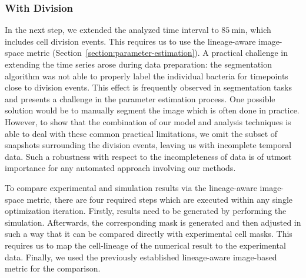 \subsubsection{With Division}
\label{sec:application-1-with-division}
In the next step, we extended the analyzed time interval to $\SI{85}{\minute}$, which includes cell
division events.
This requires us to use the lineage-aware image-space metric
(Section~\ref{section:parameter-estimation}).
A practical challenge in extending the time series arose during data preparation: the segmentation
algorithm was not able to properly label the individual bacteria for timepoints close to division
events.
This effect is frequently observed in segmentation tasks and presents a challenge in the
parameter estimation process.
One possible solution would be to manually segment the image which is often done in practice.
However, to show that the combination of our model and analysis techniques is able to deal
with these common practical limitations, we omit the subset of snapshots surrounding the division
events, leaving us with incomplete temporal data.
Such a robustness with respect to the incompleteness of data is of utmost importance for any
automated approach involving our methods.

To compare experimental and simulation results via the lineage-aware image-space metric,
there are four required steps which are executed within any single optimization iteration.
Firstly, results need to be generated by performing the simulation.
Afterwards, the corresponding mask is generated and then adjusted in such a way that it can be
compared directly with experimental cell masks.
This requires us to map the cell-lineage of the numerical result to the experimental data.
Finally, we used the previously established lineage-aware image-based metric for the comparison.

